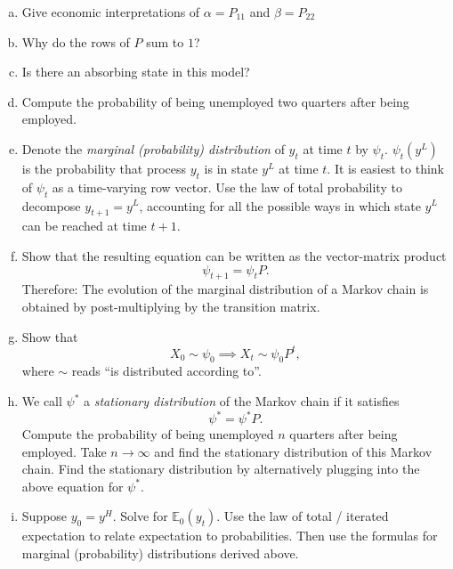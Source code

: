 \documentclass[11pt]{extarticle}
\theoremstyle{plain}
\theoremstyle{definition}
\begin{document}
\vspace{5mm}
\noindent
\begin{enumerate}[(a)]
\item Give economic interpretations of $\alpha = P_{11}$ and $\beta = P_{22}$

\item Why do the rows of $P$ sum to $1$?

\item Is there an absorbing state in this model?

\item Compute the probability of being unemployed two quarters after being employed. 

\item Denote the \textit{marginal (probability) distribution} of $y_t$ at time $t$ by $\psi_t$. $\psi_t(y^L)$ is the probability that process $y_t$ is in state $y^L$ at time $t$. It is easiest to think of $\psi_t$ as a time-varying row vector. Use the law of total probability to decompose $y_{t+1} = y^L$, accounting for all the possible ways in which state $y^L$ can be reached at time $t+1$. 

\item Show that the resulting equation can be written as the vector-matrix product
\begin{equation*}
	\psi_{t+1} = \psi_t P.
\end{equation*}
Therefore: The evolution of the marginal distribution of a Markov chain is obtained by post-multiplying by the transition matrix. 

\item Show that
\begin{equation*}
	X_0 \sim \psi_0 \implies X_t \sim \psi_0 P^t,
\end{equation*}
where $\sim$ reads ``is distributed according to''. 

\item We call $\psi^*$ a \textit{stationary distribution} of the Markov chain if it satisfies 
\begin{equation*}
	\psi^* = \psi^* P.
\end{equation*}
Compute the probability of being unemployed $n$ quarters after being employed. Take $n \to \infty$ and find the stationary distribution of this Markov chain. Find the stationary distribution by alternatively plugging into the above equation for $\psi^*$. 

\item Suppose $y_0 = y^H$. Solve for $\mathbb E_0 (y_t)$. Use the law of total / iterated expectation to relate expectation to probabilities. Then use the formulas for marginal (probability) distributions derived above. 
\end{enumerate}
\end{document}
